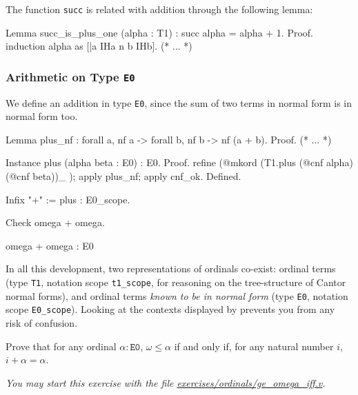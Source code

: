 The function \texttt{succ} is related with addition through the following lemma:

\begin{Coqsrc}
Lemma succ_is_plus_one (alpha : T1) :  succ alpha = alpha + 1.
Proof.
  induction alpha as [|a IHa n b IHb].
  (* ... *)
\end{Coqsrc}



\subsubsection{Arithmetic on Type \texttt{E0}}

 We define an addition in type \texttt{E0}, since the sum of two terms in normal form is in normal form too.


\begin{Coqsrc}
Lemma plus_nf : forall a,  nf a -> forall b, nf b -> nf (a + b).
Proof.
 (* ... *)

Instance plus (alpha beta : E0) : E0.
Proof.
  refine (@mkord (T1.plus (@cnf alpha) (@cnf beta))_ );
    apply plus_nf; apply cnf_ok.
Defined.

Infix "+" := plus : E0_scope.

Check omega + omega.
\end{Coqsrc}

\begin{Coqanswer}
omega + omega
     : E0
\end{Coqanswer}

\begin{remark}
In all this development, two representations of ordinals co-exist: ordinal terms (type \texttt{T1}, notation scope \texttt{t1\_scope}, for reasoning on the tree-structure of Cantor normal forms), and ordinal terms \emph{known to be in normal form} (type \texttt{E0}, notation scope \texttt{E0\_scope}). Looking at the contexts displayed by \coq{} prevents you from any risk of confusion.
\end{remark}

\begin{exercise}
Prove that for any ordinal $\alpha:\texttt{E0}$, 
$\omega\leq \alpha$ if and only if, for any natural number $i$,
$i+\alpha=\alpha$.

\emph{You may start this exercise with the file
    \href{https://github.com/coq-community/hydra-battles/tree/master/exercises/ordinals/ge_omega_iff.v}{exercises/ordinals/ge\_omega\_iff.v}.}
\end{exercise}


